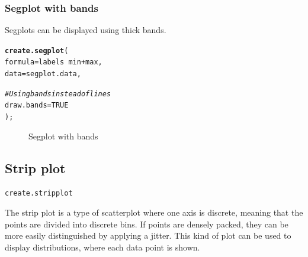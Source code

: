 \documentclass[letterpaper]{article}\usepackage[]{graphicx}\usepackage[]{color}
\makeatletter
\newcommand{\hlnum}[1]{\textcolor[rgb]{0.686,0.059,0.569}{#1}}%
\newcommand{\hlcom}[1]{\textcolor[rgb]{0.678,0.584,0.686}{\textit{#1}}}%
\newcommand{\hlopt}[1]{\textcolor[rgb]{0,0,0}{#1}}%
\newcommand{\hlstd}[1]{\textcolor[rgb]{0.345,0.345,0.345}{#1}}%
\newcommand{\hlkwc}[1]{\textcolor[rgb]{0.333,0.667,0.333}{#1}}%
\newcommand{\hlkwd}[1]{\textcolor[rgb]{0.737,0.353,0.396}{\textbf{#1}}}%
\newenvironment{kframe}{%
 \def\at@end@of@kframe{}%
 \ifinner\ifhmode%
  \def\at@end@of@kframe{\end{minipage}}%
  \begin{minipage}{\columnwidth}%
 \fi\fi%
 \def\FrameCommand##1{\hskip\@totalleftmargin \hskip-\fboxsep
 \colorbox{shadecolor}{##1}\hskip-\fboxsep
     \hskip-\linewidth \hskip-\@totalleftmargin \hskip\columnwidth}%
 \MakeFramed {\advance\hsize-\width
   \@totalleftmargin\z@ \linewidth\hsize
   \@setminipage}}%
 {\par\unskip\endMakeFramed%
 \at@end@of@kframe}
\newenvironment{knitrout}{}{} %
\makeatother
\begin{document}
\subsubsection{Segplot with bands}
Segplots can be displayed using thick bands.

\begin{knitrout}
\color{fgcolor}\begin{kframe}
\begin{alltt}
\hlkwd{create.segplot}\hlstd{(}
    \hlkwc{formula} \hlstd{= labels} \hlopt{~} \hlstd{min} \hlopt{+} \hlstd{max,}
    \hlkwc{data} \hlstd{= segplot.data,}

    \hlcom{# Using bands instead of lines}
    \hlkwc{draw.bands} \hlstd{=} \hlnum{TRUE}
    \hlstd{);}
\end{alltt}
\end{kframe}\begin{figure}[]


{\centering {} 

}

\caption[Segplot with bands]{Segplot with bands\label{fig:segplot2}}
\end{figure}


\end{knitrout}

\subsection{Strip plot}
\begin{verbatim}
create.stripplot
\end{verbatim}

The strip plot is a type of scatterplot where one axis is discrete, meaning that the points are divided into discrete bins. If points are densely packed, they can be more easily distinguished by applying a jitter. This kind of plot can be used to display distributions, where each data point is shown.
\end{document}
